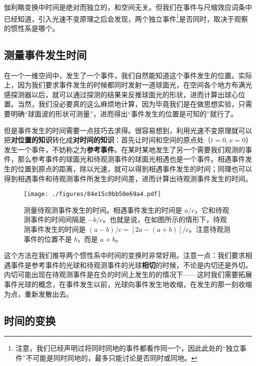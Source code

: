 

伽利略变换中时间是绝对而独立的，和空间无关。但我们在事件与尺缩效应词条中已经知道，引入光速不变原理之后会发现，两个独立事件\footnote{注意，我们已经声明过将同时同地的事件都看作同一个，因此此处的“独立事件”不可能是同时同地的，最多只能讨论是否同时或同地。}是否同时，取决于观察的惯性系是哪个。

\subsection{测量事件发生时间}

在一个一维空间中，发生了一个事件，我们自然能知道这个事件发生的位置。实际上，因为我们要求事件发生的时候都同时发射一道球面光，在空间各个地方布满光感探测器以后，就可以通过探测的结果来反推球面光的形状，进而计算出球心位置。当然，我们没必要真的这么麻烦地计算，因为毕竟我们是在做思想实验，只需要明确“球面波的形状可测量”，进而得出“事件发生的位置是可知的”就行了。

但是事件发生的时间需要一点技巧去求得。很容易想到，利用光速不变原理就可以把\textbf{对位置的知识}转化成\textbf{对时间的知识}：首先让时间和空间的原点处（$t=0, x=0$）发生一个事件，不妨称之为\textbf{参考事件}。在某时某地发生了另一个需要我们观测的事件，那么参考事件的球面光和待观测事件的球面光相遇也是一个事件。相遇事件发生的位置到原点的距离，除以光速，就可以得到相遇事件发生的时间；同理也可以得到相遇事件和待观测事件所发生的时间差，进而计算出待观测事件发生的时间。

\begin{figure}[ht]
\centering
\texttt{[image: ./figures/84e15c0bb50e69a4.pdf]}
\caption{测量待观测事件发生的时间。相遇事件发生的时间是 $a/c$，它和待观测事件的时间间隔是 $-b/c$。也就是说，在如图所示的情形下，待观测事件发生的时间是 $(a-b)/c=[2a-(a+b)]/c$。注意待观测事件的位置不是 $b$，而是 $a+b$。} \label{fig_SRtime_1}
\end{figure}

这个方法在我们推导两个惯性系中时间的变换时非常好用。注意一点：我们要求相遇事件是参考事件的光球和待观测事件的光球\textbf{相切}的时候，不论是内切还是外切。内切可能出现在待观测事件是在负的时间上发生的的情况下——这时我们需要拓展事件光球的概念，在事件发生以前，光球向事件发生地收缩，在发生的那一刻收缩为点，重新发散出去。

\subsection{时间的变换}

